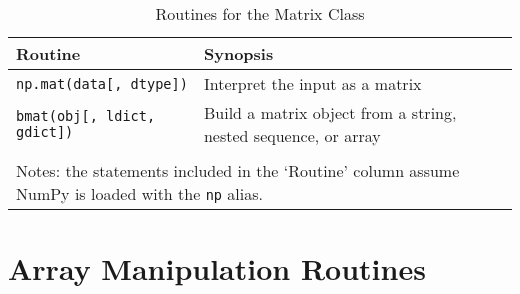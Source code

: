 \documentclass[a4paper,11pt]{book}
\numberwithin{figure}{chapter}
\numberwithin{table}{chapter}
\begin{document}
\begin{sidewaystable}[!htbp]
	\centering
	\caption{Routines for the Matrix Class}
	\label{tab:array_for_matrix_class}
	\begin{tabular}{lp{12cm}}
		\toprule \toprule
			Routine & Synopsis \\
			\midrule
			\texttt{np.mat(data[, dtype])}
			& Interpret the input as a matrix\\
			\texttt{bmat(obj[, ldict, gdict])}
			& Build a matrix object from a string, nested sequence, or array\\
			\bottomrule \\[-1.8ex]
			\multicolumn{2}{l}{Notes: the statements included in the `Routine' column assume NumPy is loaded with the \texttt{np} alias.} \\
	\end{tabular}
\end{sidewaystable}
\clearpage

\section{Array Manipulation Routines}
\end{document}
